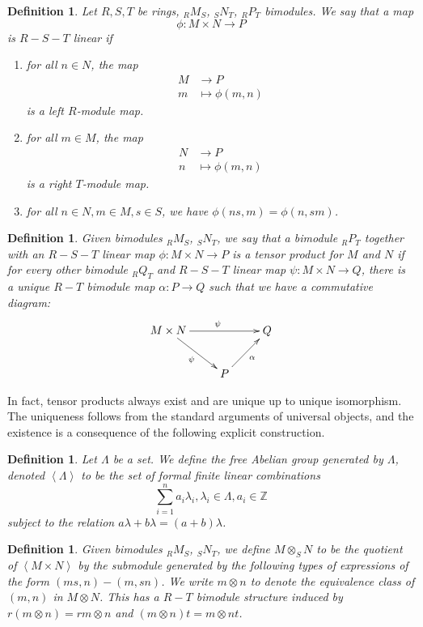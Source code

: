 \documentclass[12pt]{report}
\theoremstyle{plain}
\newtheorem{defn}[thm]{Definition}
\newcommand{\ZZ}{\mathbb{Z}}
\begin{document}
\begin{defn}
Let $R, S, T$ be rings, $_R M_S$, $_S N_T$, $_R P _T$ bimodules. We say
that a map
\[\phi : M \times N \to P\]
is $R-S-T$ linear if
\begin{enumerate}[1. ]
\item for all $n \in N$, the map
\begin{align*}
M &\to P \\
m &\mapsto \phi(m, n)
\end{align*}
is a left $R$-module map.
\item for all $m \in M$, the map
\begin{align*}
N &\to P \\
n &\mapsto \phi(m, n)
\end{align*}
is a right $T$-module map.
\item for all $n \in N, m \in M, s \in S$, we have $\phi(ns, m) = \phi(n,
sm)$.
\end{enumerate}
\end{defn}

\begin{defn}
Given bimodules $ _R M_S$, $_S N_T$, we say that a bimodule $ _R P_T$
together with an $R-S-T$ linear map $\phi: M \times N \to P$ is a tensor product
for $M$ and $N$ if for every other bimodule $_R Q_T$ and $R-S-T$ linear map
$\psi : M \times N \to Q$, there is a unique $R-T$ bimodule map $\alpha : P
\to Q$ such that we have a commutative diagram:
\[\xymatrix{
M \times N \ar[rd]_{\psi} \ar[rr]^\psi & & Q \\
 & P \ar[ru]_{\alpha}
}\]
\end{defn}

In fact, tensor products always exist and are unique up to unique
isomorphism. The uniqueness follows from the standard arguments of
universal objects, and the existence is a consequence of the following
explicit construction.

\begin{defn}
Let $\Lambda$ be a set. We define the free Abelian group
generated by $\Lambda$, denoted $\left<\Lambda\right>$ to be the set
of formal finite linear combinations
\[\sum_{i = 1}^n a_i \lambda_i , \lambda_i \in
\Lambda, a_i \in \ZZ \]
subject to the relation $a \lambda + b \lambda = (a + b) \lambda$.
\end{defn}

\begin{defn}
Given bimodules $_R M _S$, $_S N _T$, we define $M \otimes_S N$ to be the
quotient of $\left< M \times N \right>$ by the submodule generated by
the following types of expressions of the form $(ms, n) - (m, sn)$.
We write $m \otimes n$ to denote the equivalence class of $(m,
n)$ in $M \otimes N$. This has a $R-T$ bimodule structure induced by $r(m
\otimes n) = rm \otimes n$ and $(m \otimes n) t = m \otimes nt$.
\end{defn}
\end{document}
